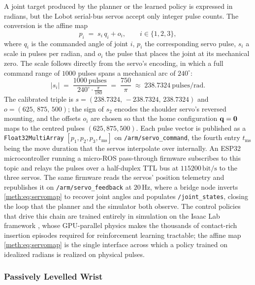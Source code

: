 A joint target produced by the planner or the learned policy is expressed in radians, but the Lobot serial-bus servos accept only integer pulse counts. The conversion is the affine map
\begin{equation}
  p_i \;=\; s_i\,q_i + o_i, \qquad i \in \{1,2,3\},
  \label{meth:eq:servomap}
\end{equation}
where $q_i$ is the commanded angle of joint $i$, $p_i$ the corresponding servo pulse, $s_i$ a scale in pulses per radian, and $o_i$ the pulse that places the joint at its mechanical zero. The scale follows directly from the servo's encoding, in which a full command range of $1000$ pulses spans a mechanical arc of $\ensuremath{240^{\circ}}$:
\begin{equation}
  |s_i| \;=\; \frac{1000\ \text{pulses}}{\ensuremath{240^{\circ}}\cdot \tfrac{\pi}{180}} \;=\; \frac{750}{\pi} \;\approx\; 238.7324\ \text{pulses}/\ensuremath{\mathrm{rad}}.
  \label{meth:eq:servoscale}
\end{equation}
The calibrated triple is $s = (238.7324,\,-238.7324,\,238.7324)$ and $o = (625,\,875,\,500)$; the sign of $s_2$ encodes the shoulder servo's reversed mounting, and the offsets $o_i$ are chosen so that the home configuration $\mathbf{q} = \mathbf{0}$ maps to the centred pulses $(625,875,500)$. Each pulse vector is published as a \texttt{Float32MultiArray} $[p_1,p_2,p_3,t_{\mathrm{ms}}]$ on \texttt{/arm/servo\_command}, the fourth entry $t_{\mathrm{ms}}$ being the move duration that the servos interpolate over internally. An ESP32 microcontroller running a micro-ROS pass-through firmware subscribes to this topic and relays the pulses over a half-duplex TTL bus at $\ensuremath{115200\,\mathrm{bit/s}}$ to the three servos. The same firmware reads the servos' position telemetry and republishes it on \texttt{/arm/servo\_feedback} at $\ensuremath{20\,\mathrm{Hz}}$, where a bridge node inverts \eqref{meth:eq:servomap} to recover joint angles and populates \texttt{/joint\_states}, closing the loop that the planner and the simulator both observe. The control policies that drive this chain are trained entirely in simulation on the Isaac Lab framework \cite{mittal_2023_orbit}, whose GPU-parallel physics \cite{makoviychuk_2021_isaacgym} makes the thousands of contact-rich insertion episodes required for reinforcement learning tractable; the affine map \eqref{meth:eq:servomap} is the single interface across which a policy trained on idealized radians is realized on physical pulses.

\subsubsection{Passively Levelled Wrist}\label{meth:sec:manip:wrist}


